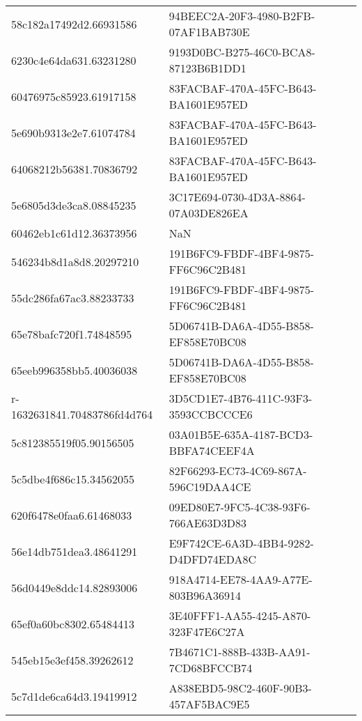 \begin{tabular}{ll}
58c182a17492d2.66931586 & 94BEEC2A-20F3-4980-B2FB-07AF1BAB730E \\
6230c4e64da631.63231280 & 9193D0BC-B275-46C0-BCA8-87123B6B1DD1 \\
60476975c85923.61917158 & 83FACBAF-470A-45FC-B643-BA1601E957ED \\
5e690b9313e2e7.61074784 & 83FACBAF-470A-45FC-B643-BA1601E957ED \\
64068212b56381.70836792 & 83FACBAF-470A-45FC-B643-BA1601E957ED \\
5e6805d3de3ca8.08845235 & 3C17E694-0730-4D3A-8864-07A03DE826EA \\
60462eb1c61d12.36373956 & NaN \\
546234b8d1a8d8.20297210 & 191B6FC9-FBDF-4BF4-9875-FF6C96C2B481 \\
55dc286fa67ac3.88233733 & 191B6FC9-FBDF-4BF4-9875-FF6C96C2B481 \\
65e78bafc720f1.74848595 & 5D06741B-DA6A-4D55-B858-EF858E70BC08 \\
65eeb996358bb5.40036038 & 5D06741B-DA6A-4D55-B858-EF858E70BC08 \\
r-1632631841.70483786fd4d764 & 3D5CD1E7-4B76-411C-93F3-3593CCBCCCE6 \\
5c812385519f05.90156505 & 03A01B5E-635A-4187-BCD3-BBFA74CEEF4A \\
5c5dbe4f686c15.34562055 & 82F66293-EC73-4C69-867A-596C19DAA4CE \\
620f6478e0faa6.61468033 & 09ED80E7-9FC5-4C38-93F6-766AE63D3D83 \\
56e14db751dea3.48641291 & E9F742CE-6A3D-4BB4-9282-D4DFD74EDA8C \\
56d0449e8ddc14.82893006 & 918A4714-EE78-4AA9-A77E-803B96A36914 \\
65ef0a60bc8302.65484413 & 3E40FFF1-AA55-4245-A870-323F47E6C27A \\
545eb15e3ef458.39262612 & 7B4671C1-888B-433B-AA91-7CD68BFCCB74 \\
5c7d1de6ca64d3.19419912 & A838EBD5-98C2-460F-90B3-457AF5BAC9E5 \\
\bottomrule
\end{tabular}
